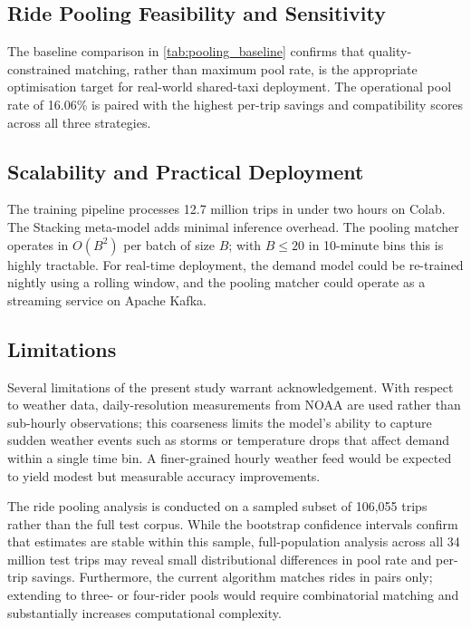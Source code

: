 \documentclass[a4paper,fleqn]{cas-dc}
\begin{document}
\subsection{Ride Pooling Feasibility and Sensitivity}

The baseline comparison in \autoref{tab:pooling_baseline} confirms that quality-constrained matching, rather than maximum pool rate, is the appropriate optimisation target for real-world shared-taxi deployment.  The operational pool rate of 16.06\% is paired with the highest per-trip savings and compatibility scores across all three strategies.

\subsection{Scalability and Practical Deployment}

The training pipeline processes 12.7 million trips in under two hours on Colab.  The Stacking meta-model adds minimal inference overhead.  The pooling matcher operates in $O(B^2)$ per batch of size $B$; with $B \leq 20$ in 10-minute bins this is highly tractable.  For real-time deployment, the demand model could be re-trained nightly using a rolling window, and the pooling matcher could operate as a streaming service on Apache Kafka.

\subsection{Limitations}

Several limitations of the present study warrant acknowledgement.  With respect to weather data, daily-resolution measurements from NOAA are used rather than sub-hourly observations; this coarseness limits the model's ability to capture sudden weather events such as storms or temperature drops that affect demand within a single time bin.  A finer-grained hourly weather feed would be expected to yield modest but measurable accuracy improvements.

The ride pooling analysis is conducted on a sampled subset of 106,055 trips rather than the full test corpus.  While the bootstrap confidence intervals confirm that estimates are stable within this sample, full-population analysis across all 34 million test trips may reveal small distributional differences in pool rate and per-trip savings.  Furthermore, the current algorithm matches rides in pairs only; extending to three- or four-rider pools would require combinatorial matching and substantially increases computational complexity.
\end{document}
